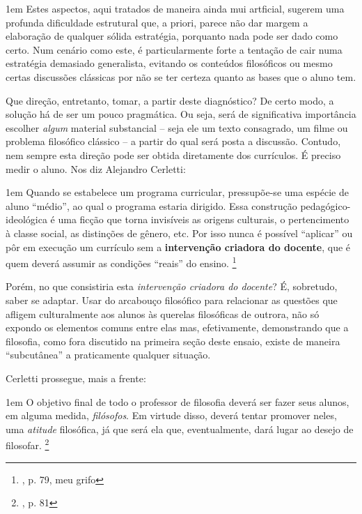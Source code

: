 \documentclass[12pt,a4paper]{article}
\newenvironment{citac}{
	\begin{addmargin}[4cm]{1em} \footnotesize}{\normalfont \end{addmargin}
}
\begin{document}
\begin{citac}
	Estes aspectos, aqui tratados de maneira ainda mui artficial, 
	sugerem uma profunda dificuldade estrutural que, a priori, parece 
	não dar margem a elaboração de qualquer sólida estratégia, porquanto 
	nada pode ser dado como certo. Num cenário como este, é 
	particularmente forte a tentação de cair numa estratégia demasiado 
	generalista, evitando os conteúdos filosóficos ou mesmo certas 
	discussões clássicas por não se ter certeza quanto as bases que 
	o aluno tem. 

	Que direção, entretanto, tomar, a partir deste diagnóstico? De certo 
	modo, a solução há de ser um pouco pragmática. Ou seja, será de 
	significativa importância escolher \emph{algum} material substancial
	-- seja ele um texto consagrado, um filme ou problema filosófico 
	clássico -- a partir do qual será posta a discussão. Contudo, nem 
	sempre esta direção pode ser obtida diretamente dos currículos. É 
	preciso medir o aluno. Nos diz Alejandro Cerletti: 

	\begin{citac}
		Quando se estabelece um programa curricular, pressupõe-se 
		uma espécie de aluno “médio”, ao qual o programa estaria 
		dirigido. Essa construção pedagógico-ideológica é uma 
		ficção que torna invisíveis as origens culturais, o 
		pertencimento à classe social, as distinções de gênero, 
		etc. Por isso nunca é possível “aplicar” ou pôr em 
		execução um currículo sem a \textbf{intervenção 
		criadora do docente}, que é quem deverá assumir as 
		condições “reais” do ensino. 
		\footnote{\cite{cerletti}, p. 79, meu grifo}
	\end{citac}

	Porém, no que consistiria esta \emph{intervenção criadora do docente}? 
	É, sobretudo, saber se adaptar. Usar do arcabouço filosófico para 
	relacionar as questões que afligem culturalmente aos alunos às 
	querelas filosóficas de outrora, não só expondo os elementos comuns 
	entre elas mas, efetivamente, demonstrando que a filosofia, como 
	fora discutido na primeira seção deste ensaio, existe de maneira 
	“subcutânea” a praticamente qualquer situação. 

	Cerletti prossegue, mais a frente: 

	\begin{citac}
		O objetivo final de todo o professor de filosofia deverá ser
		fazer seus alunos, em alguma medida, \textit{filósofos}. Em 
		virtude disso, deverá tentar promover neles, uma \textit{
		atitude} filosófica, já que será ela que, eventualmente, dará 
		lugar ao desejo de filosofar. 
		\footnote{\cite{cerletti}, p. 81}
	\end{citac}


\end{citac}
\end{document}
